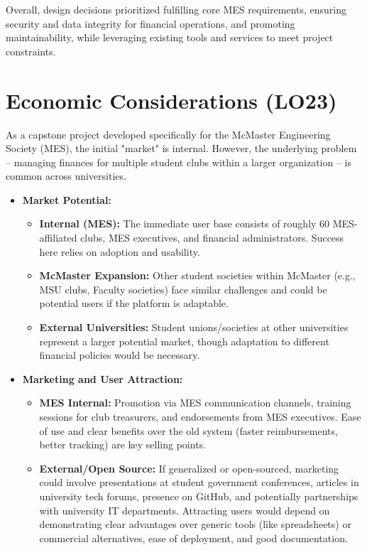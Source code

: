 \documentclass{article}
\begin{document}
Overall, design decisions prioritized fulfilling core MES requirements, ensuring security and data integrity for financial operations, and promoting maintainability, while leveraging existing tools and services to meet project constraints.


\section{Economic Considerations (LO23)}


As a capstone project developed specifically for the McMaster Engineering Society (MES), the initial "market" is internal. However, the underlying problem – managing finances for multiple student clubs within a larger organization – is common across universities.

\begin{itemize}
    \item \textbf{Market Potential:}
        \begin{itemize}
            \item \textbf{Internal (MES):} The immediate user base consists of roughly 60 MES-affiliated clubs, MES executives, and financial administrators. Success here relies on adoption and usability.
            \item \textbf{McMaster Expansion:} Other student societies within McMaster (e.g., MSU clubs, Faculty societies) face similar challenges and could be potential users if the platform is adaptable.
            \item \textbf{External Universities:} Student unions/societies at other universities represent a larger potential market, though adaptation to different financial policies would be necessary.
        \end{itemize}

    \item \textbf{Marketing and User Attraction:}
        \begin{itemize}
            \item \textbf{MES Internal:} Promotion via MES communication channels, training sessions for club treasurers, and endorsements from MES executives. Ease of use and clear benefits over the old system (faster reimbursements, better tracking) are key selling points.
            \item \textbf{External/Open Source:} If generalized or open-sourced, marketing could involve presentations at student government conferences, articles in university tech forums, presence on GitHub, and potentially partnerships with university IT departments. Attracting users would depend on demonstrating clear advantages over generic tools (like spreadsheets) or commercial alternatives, ease of deployment, and good documentation.
        \end{itemize}


\end{itemize}
\end{document}
